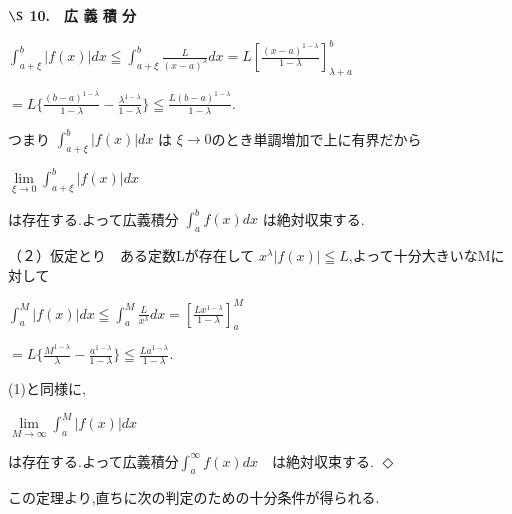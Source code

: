 \documentclass[10.5pt,uplatex,a5paper]{jsarticle} %
\begin{document}
\pagestyle{empty}
\setlength\parindent{0pt}

\newcommand{\absoluteFx}[0]{\int_{a + \xi}^b |f(x)| dx}




\begin{center}
    \textbf{$\S$ 10.　広 義 積 分}
\end{center}



\begin{center}
    
    $\absoluteFx \leqq\int_{a+\xi}^b\frac{L}{(x-a)^\lambda}dx=L\left[\frac{(x-a)^{1-\lambda}}{1-\lambda}\right]_{\lambda+a}^b$
    
    $=L\{ \frac{(b-a)^{1-\lambda}}{1-\lambda}-\frac{\lambda^{1-\lambda}}{1-\lambda}\}\leqq\frac{L(b-a)^{1-\lambda}}{1-\lambda}$.
   
\end{center}




つまり  $\absoluteFx$    は $\xi \rightarrow 0$のとき単調増加で上に有界だから


\begin{center}
    $\lim\limits_{\xi \to 0} \absoluteFx$
\end{center}


は存在する.よって広義積分 $\int_a^b f(x)dx$ は絶対収束する.


（２）仮定とり　ある定数Lが存在して $x^\lambda|f(x)|\leqq L$,よって十分大きいなMに対して


\begin{center}

    $\int_a^M |f(x)|dx \leqq \int_a^M \frac{L}{x^\lambda}dx=\left[\frac{Lx^{1-\lambda}}{1-\lambda}\right]_a^M$

    $=L\{\frac{M^{1-\lambda}}{\lambda}-\frac{a^{1-\lambda}}{1-\lambda}\}\leqq\frac{La^{1-\lambda}}{1-\lambda}$.

\end{center}


(1)と同様に,

\begin{center}

    $\lim\limits_{M \to \infty}\int_a^M|f(x) |dx$

\end{center}

は存在する.よって広義積分$\int_a^\infty f(x)dx $　は絶対収束する. $\Diamond$

この定理より,直ちに次の判定のための十分条件が得られる.
\end{document}
